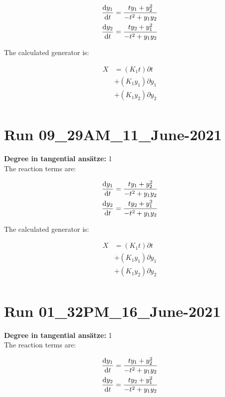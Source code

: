 \begin{align*}
\dv{y_{1}}{t}&=\frac{t y_{1} + y_{2}^{2}}{- t^{2} + y_{1} y_{2}}\\
\dv{y_{2}}{t}&=\frac{t y_{2} + y_{1}^{2}}{- t^{2} + y_{1} y_{2}}\\
\end{align*}

The calculated generator is:

\begin{align*}
X&=\left(K_{1} t\right)\partial t\\&+\left(K_{1} y_{1}\right)\partial y_{1}\\&+\left(K_{1} y_{2}\right)\partial y_{2}\\\end{align*}
\section*{Run 09\_29AM\_11\_June-2021}
\textbf{Degree in tangential ansätze:}	1\\
The reaction terms are:

\begin{align*}
\dv{y_{1}}{t}&=\frac{t y_{1} + y_{2}^{2}}{- t^{2} + y_{1} y_{2}}\\
\dv{y_{2}}{t}&=\frac{t y_{2} + y_{1}^{2}}{- t^{2} + y_{1} y_{2}}\\
\end{align*}

The calculated generator is:

\begin{align*}
X&=\left(K_{1} t\right)\partial t\\&+\left(K_{1} y_{1}\right)\partial y_{1}\\&+\left(K_{1} y_{2}\right)\partial y_{2}\\\end{align*}
\section*{Run 01\_32PM\_16\_June-2021}
\textbf{Degree in tangential ansätze:}	1\\
The reaction terms are:

\begin{align*}
\dv{y_{1}}{t}&=\frac{t y_{1} + y_{2}^{2}}{- t^{2} + y_{1} y_{2}}\\
\dv{y_{2}}{t}&=\frac{t y_{2} + y_{1}^{2}}{- t^{2} + y_{1} y_{2}}\\
\end{align*}

